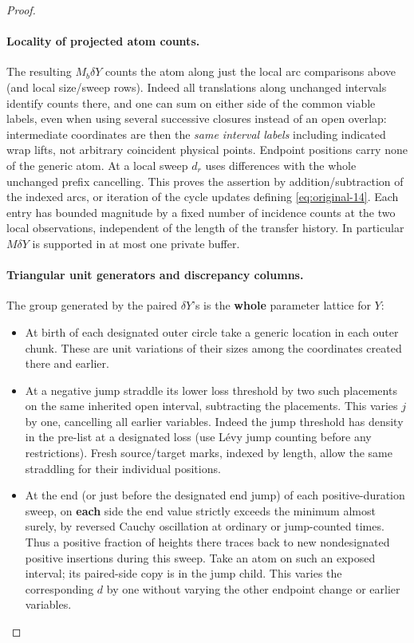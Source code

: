 \begin{proof}
\paragraph{Locality of projected atom counts.}

The resulting \(M_b\delta Y\) counts the atom along just the local arc comparisons above (and local
size/sweep rows). Indeed all translations along unchanged intervals identify counts there, and one can sum
on either side of the common viable labels, even when using several successive closures instead of an open
overlap: intermediate coordinates are then the \emph{same interval labels} including indicated wrap lifts,
not arbitrary coincident physical points. Endpoint positions carry none of the generic atom. At a local
sweep \(d_r\) uses differences with the whole unchanged prefix cancelling. This proves the assertion by
addition/subtraction of the indexed arcs, or iteration of the cycle updates defining \eqref{eq:original-14}.
Each entry has bounded magnitude by a fixed number of incidence counts at the two local observations,
independent of the length of the transfer history. In particular \(M\delta Y\) is supported in at most one
private buffer.

\paragraph{Triangular unit generators and discrepancy columns.}

The group generated by the paired \(\delta Y\)'s is the \textbf{whole} parameter lattice for \(Y\):
\begin{itemize}
\item At birth of each designated outer circle take a generic location in each outer chunk. These are unit variations of their sizes among the coordinates created there and earlier.
\item At a negative jump straddle its lower loss threshold by two such placements on the same inherited open interval, subtracting the placements. This varies \(j\) by one, cancelling all earlier variables. Indeed the jump threshold has density in the pre-list at a designated loss (use Lévy jump counting before any restrictions). Fresh source/target marks, indexed by length, allow the same straddling for their individual positions.
\item At the end (or just before the designated end jump) of each positive-duration sweep, on \textbf{each} side the end value strictly exceeds the minimum almost surely, by reversed Cauchy oscillation at ordinary or jump-counted times. Thus a positive fraction of heights there traces back to new nondesignated positive insertions during this sweep. Take an atom on such an exposed interval; its paired-side copy is in the jump child. This varies the corresponding \(d\) by one without varying the other endpoint change or earlier variables.
\end{itemize}


\end{proof}
